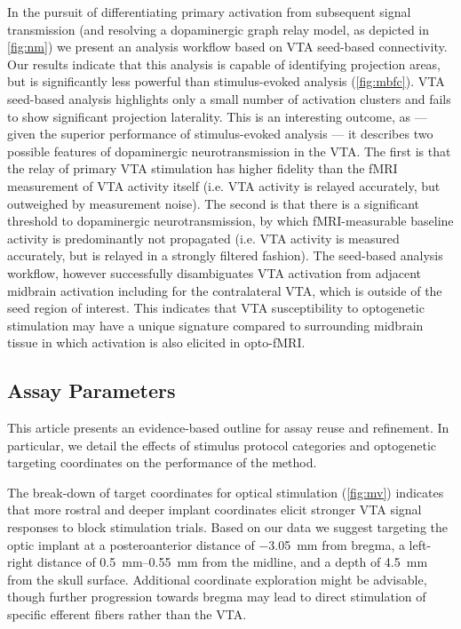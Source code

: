 In the pursuit of differentiating primary activation from subsequent signal transmission (and resolving a dopaminergic graph relay model, as depicted in \cref{fig:nm}) we present an analysis workflow based on VTA seed-based connectivity.
Our results indicate that this analysis is capable of identifying projection areas, but is significantly less powerful than stimulus-evoked analysis (\cref{fig:mbfc}).
VTA seed-based analysis highlights only a small number of activation clusters and fails to show significant projection laterality.
This is an interesting outcome, as --- given the superior performance of stimulus-evoked analysis --- it describes two possible features of dopaminergic neurotransmission in the VTA.
The first is that the relay of primary VTA stimulation has higher fidelity than the fMRI measurement of VTA activity itself (i.e. VTA activity is relayed accurately, but outweighed by measurement noise).
The second is that there is a significant threshold to dopaminergic neurotransmission, by which fMRI-measurable baseline activity is predominantly not propagated (i.e. VTA activity is measured accurately, but is relayed in a strongly filtered fashion).
The seed-based analysis workflow, however successfully disambiguates VTA activation from adjacent midbrain activation including for the contralateral VTA, which is outside of the seed region of interest.
This indicates that VTA susceptibility to optogenetic stimulation may have a unique signature compared to surrounding midbrain tissue in which activation is also elicited in opto-fMRI.

\subsection{Assay Parameters}

This article presents an evidence-based outline for assay reuse and refinement.
In particular, we detail the effects of stimulus protocol categories and optogenetic targeting coordinates on the performance of the method.

The break-down of target coordinates for optical stimulation (\cref{fig:mv}) indicates that more rostral and deeper implant coordinates elicit stronger VTA signal responses to block stimulation trials.
Based on our data we suggest targeting the optic implant at
a posteroanterior distance of \SI{-3.05}{\milli\meter} from bregma,
a left-right distance of \SIrange{0.5}{0.55}{\milli\meter} from the midline,
and a depth of \SI{4.5}{\milli\meter} from the skull surface.
Additional coordinate exploration might be advisable, though further progression towards bregma may lead to direct stimulation of specific efferent fibers rather than the VTA.

